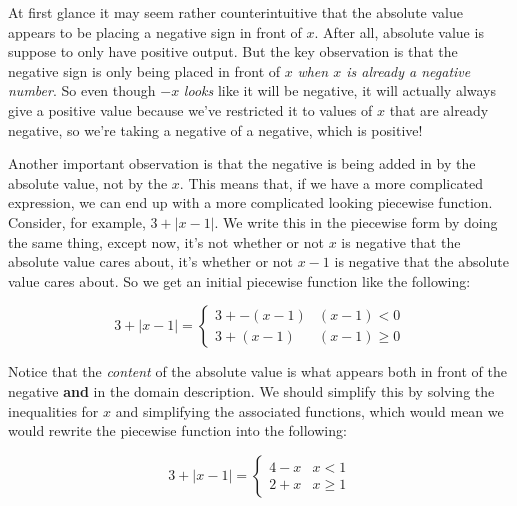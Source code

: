 \documentclass{ximeraXloud}
\begin{document}
At first glance it may seem rather counterintuitive that the absolute value appears to be placing a negative sign in front of $x$. After all, absolute value is suppose to only have positive output. But the key observation is that the negative sign is only being placed in front of $x$ \textit{when $x$ is already a negative number}. So even though $-x$ \textit{looks} like it will be negative, it will actually always give a positive value because we've restricted it to values of $x$ that are already negative, so we're taking a negative of a negative, which is positive!

Another important observation is that the negative is being added in by the absolute value, not by the $x$. This means that, if we have a more complicated expression, we can end up with a more complicated looking piecewise function. Consider, for example, $3 + |x - 1|$. We write this in the piecewise form by doing the same thing, except now, it's not whether or not $x$ is negative that the absolute value cares about, it's whether or not $x-1$ is negative that the absolute value cares about. So we get an initial piecewise function like the following:

\[
    3 + |x-1| = 
        \begin{cases}
            3 + -(x-1) & (x-1) < 0 \\
            3 + (x-1) & (x-1) \geq 0
        \end{cases}
\]

Notice that the \textit{content} of the absolute value is what appears both in front of the negative \textbf{and} in the domain description. We should simplify this by solving the inequalities for $x$ and simplifying the associated functions, which would mean we would rewrite the piecewise function into the following:

\[
    3 + |x-1| = 
        \begin{cases}
            4 - x & x < 1 \\
            2 + x & x \geq 1
        \end{cases}
\]
\end{document}

